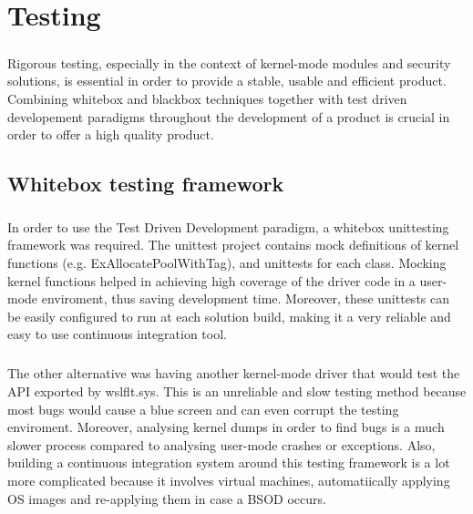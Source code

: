 \chapter{Testing}
    \paragraph{}
    Rigorous testing, especially in the context of kernel-mode modules and security solutions, is essential in order to provide a stable,
    usable and efficient product. Combining whitebox and blackbox techniques together with test driven developement paradigms throughout
    the development of a product is crucial in order to offer a high quality product.
    
    \section{Whitebox testing framework}
        \paragraph{}
        In order to use the Test Driven Development paradigm, a whitebox unittesting framework was required. The unittest project contains
        mock definitions of kernel functions (e.g. ExAllocatePoolWithTag), and unittests for each class. Mocking kernel functions helped in
        achieving high coverage of the driver code in a user-mode enviroment, thus saving development time. Moreover, these unittests can be
        easily configured to run at each solution build, making it a very reliable and easy to use continuous integration tool.
        
        \paragraph{}
        The other alternative was having another kernel-mode driver that would test the API exported by wslflt.sys. This is an unreliable
        and slow testing method because most bugs would cause a blue screen and can even corrupt the testing enviroment. Moreover, analysing
        kernel dumps in order to find bugs is a much slower process compared to analysing user-mode crashes or exceptions. Also, building a
        continuous integration system around this testing framework is a lot more complicated because it involves virtual machines,
        automatiically applying OS images and re-applying them in case a BSOD occurs.
        
